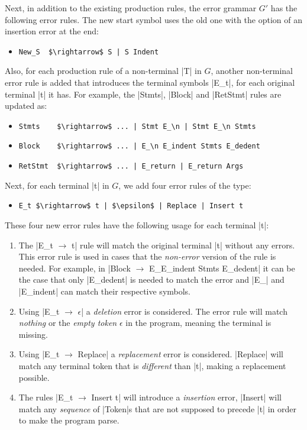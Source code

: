 Next, in addition to the existing production rules, the error grammar $G'$ has
the following error rules. The new start symbol uses the old one with the option
of an insertion error at the end:
\begin{itemize}
  \item \lstinline{New_S  $\rightarrow$ S | S Indent}
\end{itemize}
Also, for each production rule of a non-terminal |T| in $G$, another
non-terminal error rule is added that introduces the terminal symbols |E_t|, for
each original terminal |t| it has. For example, the |Stmts|, |Block| and
|RetStmt| rules are updated as:
\begin{itemize}
  \item \lstinline{Stmts    $\rightarrow$ ... | Stmt E_\n | Stmt E_\n Stmts}
  \item \lstinline{Block    $\rightarrow$ ... | E_\n E_indent Stmts E_dedent}
  \item \lstinline{RetStmt  $\rightarrow$ ... | E_return | E_return Args}
\end{itemize}
Next, for each terminal |t| in $G$, we add four error rules of the type:
\begin{itemize}
  \item \lstinline{E_t $\rightarrow$ t | $\epsilon$ | Replace | Insert t}
\end{itemize}
These four new error rules have the following usage for each terminal |t|:
\begin{enumerate}
  \item The |E_t $\rightarrow$ t| rule will match the original terminal |t| without any
  errors. This error rule is used in cases that the \emph{non-error} version of
  the rule is needed. For example, in \break
  |Block $\rightarrow$ E_\n E_indent Stmts E_dedent| it can be the case that only
  |E_dedent| is needed to match the error and |E_\n| and |E_indent| can match
  their respective symbols.
  \item Using |E_t $\rightarrow$ $\epsilon$| a \emph{deletion} error is considered. The
  error rule will match \emph{nothing} or the \emph{empty token} $\epsilon$ in
  the program, meaning the terminal is missing.
  \item Using |E_t $\rightarrow$ Replace| a \emph{replacement} error is considered.
  |Replace| will match any terminal token that is \emph{different} than |t|,
  making a replacement possible.
  \item  The rules |E_t $\rightarrow$ Insert t| will introduce a \emph{insertion} error,
  \ie |Insert| will match any \emph{sequence} of |Token|s that are not supposed
  to precede |t| in order to make the program parse.
\end{enumerate}
